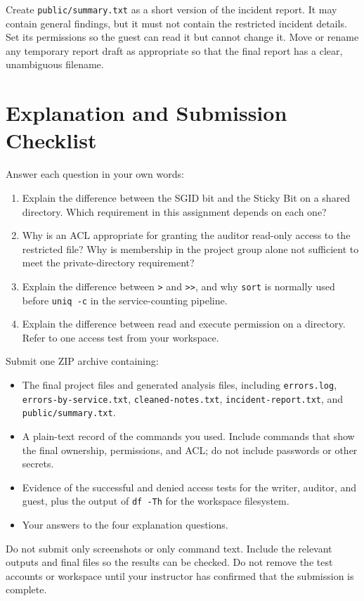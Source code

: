 Create \texttt{public/summary.txt} as a short version of the incident report. It may contain general findings, but it must not contain the restricted incident details. Set its permissions so the guest can read it but cannot change it. Move or rename any temporary report draft as appropriate so that the final report has a clear, unambiguous filename.

\section{Explanation and Submission Checklist}

Answer each question in your own words:
\begin{enumerate}
    \item Explain the difference between the SGID bit and the Sticky Bit on a shared directory. Which requirement in this assignment depends on each one?
    \item Why is an ACL appropriate for granting the auditor read-only access to the restricted file? Why is membership in the project group alone not sufficient to meet the private-directory requirement?
    \item Explain the difference between \texttt{>} and \texttt{>>}, and why \texttt{sort} is normally used before \texttt{uniq -c} in the service-counting pipeline.
    \item Explain the difference between read and execute permission on a directory. Refer to one access test from your workspace.
\end{enumerate}

Submit one ZIP archive containing:
\begin{itemize}
    \item The final project files and generated analysis files, including \texttt{errors.log}, \texttt{errors-by-service.txt}, \texttt{cleaned-notes.txt}, \texttt{incident-report.txt}, and \texttt{public/summary.txt}.
    \item A plain-text record of the commands you used. Include commands that show the final ownership, permissions, and ACL; do not include passwords or other secrets.
    \item Evidence of the successful and denied access tests for the writer, auditor, and guest, plus the output of \texttt{df -Th} for the workspace filesystem.
    \item Your answers to the four explanation questions.
\end{itemize}

Do not submit only screenshots or only command text. Include the relevant outputs and final files so the results can be checked. Do not remove the test accounts or workspace until your instructor has confirmed that the submission is complete.

\setcounter{secnumdepth}{2}
